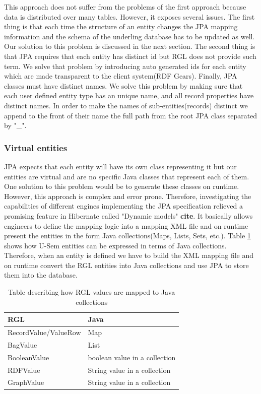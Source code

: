 This approach does not suffer from the problems of the first approach because data is distributed over many tables. However, it exposes several issues. The first thing is that each time the structure of an entity changes the JPA mapping information and the schema of the underling database has to be updated as well. Our solution to this problem is discussed in the next section. The second thing is that JPA requires that each entity has distinct id but RGL does not provide such term. We solve that problem by introducing auto generated ids for each entity which are made transparent to the client system(RDF Gears). Finally, JPA classes must have distinct names. We solve this problem by making sure that each user defined entity type has an unique name, and all record properties have distinct names. In order to make the names of sub-entities(records) distinct we append to the front of their name the full path from the root JPA class separated by "\_".


\subsubsection{Virtual entities}

JPA expects that each entity will have its own class representing it but our entities are virtual and are no specific Java classes that represent each of them. One solution to this problem would be to generate these classes on runtime. However, this approach is complex and error prone. Therefore, investigating the capabilities of different engines implementing the JPA specification relieved a promising feature in Hibernate called "Dynamic models" \textbf{cite}. It basically allows engineers to define the mapping logic into a mapping XML file and on runtime present the entities in the form Java collections(Maps, Lists, Sets, etc.). Table \ref{tbl:rgl2java} shows how U-Sem entities can be expressed in terms of Java collections. Therefore, when an entity is defined we have to build the XML mapping file and on runtime convert the RGL entities into Java collections and use JPA to store them into the database.

\begin{table}[h]
    \begin{tabular}{ | l | l |}
    \hline
    RGL & Java  \\ \hline
    RecordValue/ValueRow & Map  \\ \hline
    BagValue & List  \\ \hline
    BooleanValue & boolean value in a collection  \\ \hline
    RDFValue & String value in a collection  \\ \hline
	GraphValue & String  value in a collection  \\ \hline

    \end{tabular}
     \caption{Table describing how RGL values are mapped to Java collections}
    \label{tbl:rgl2java}
\end{table}
 
